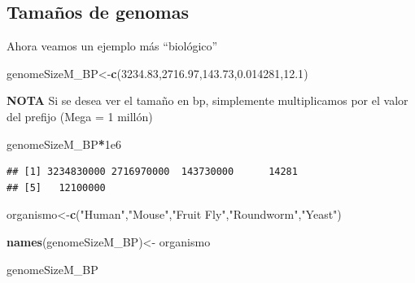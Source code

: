 \documentclass[
]{book}
\newenvironment{Shaded}{\begin{snugshade}}{\end{snugshade}}
\newcommand{\FloatTok}[1]{\textcolor[rgb]{0.00,0.00,0.81}{#1}}
\newcommand{\FunctionTok}[1]{\textcolor[rgb]{0.13,0.29,0.53}{\textbf{#1}}}
\newcommand{\NormalTok}[1]{#1}
\newcommand{\OtherTok}[1]{\textcolor[rgb]{0.56,0.35,0.01}{#1}}
\newcommand{\SpecialCharTok}[1]{\textcolor[rgb]{0.81,0.36,0.00}{\textbf{#1}}}
\newcommand{\StringTok}[1]{\textcolor[rgb]{0.31,0.60,0.02}{#1}}
\begin{document}
\subsection{Tamaños de genomas}\label{tamauxf1os-de-genomas}

Ahora veamos un ejemplo más ``biológico''

\begin{Shaded}
\begin{Highlighting}[]
\NormalTok{genomeSizeM\_BP}\OtherTok{\textless{}{-}}\FunctionTok{c}\NormalTok{(}\FloatTok{3234.83}\NormalTok{,}\FloatTok{2716.97}\NormalTok{,}\FloatTok{143.73}\NormalTok{,}\FloatTok{0.014281}\NormalTok{,}\FloatTok{12.1}\NormalTok{)}
\end{Highlighting}
\end{Shaded}

\textbf{NOTA} Si se desea ver el tamaño en bp, simplemente multiplicamos por el valor del prefijo (Mega = 1 millón)

\begin{Shaded}
\begin{Highlighting}[]
\NormalTok{genomeSizeM\_BP}\SpecialCharTok{*}\FloatTok{1e6}
\end{Highlighting}
\end{Shaded}

\begin{verbatim}
## [1] 3234830000 2716970000  143730000      14281
## [5]   12100000
\end{verbatim}

\begin{Shaded}
\begin{Highlighting}[]
\NormalTok{organismo}\OtherTok{\textless{}{-}}\FunctionTok{c}\NormalTok{(}\StringTok{"Human"}\NormalTok{,}\StringTok{"Mouse"}\NormalTok{,}\StringTok{"Fruit Fly"}\NormalTok{,}\StringTok{"Roundworm"}\NormalTok{,}\StringTok{"Yeast"}\NormalTok{)}
\end{Highlighting}
\end{Shaded}

\begin{Shaded}
\begin{Highlighting}[]
\FunctionTok{names}\NormalTok{(genomeSizeM\_BP)}\OtherTok{\textless{}{-}}\NormalTok{ organismo}
\end{Highlighting}
\end{Shaded}

\begin{Shaded}
\begin{Highlighting}[]
\NormalTok{genomeSizeM\_BP}
\end{Highlighting}
\end{Shaded}
\end{document}
